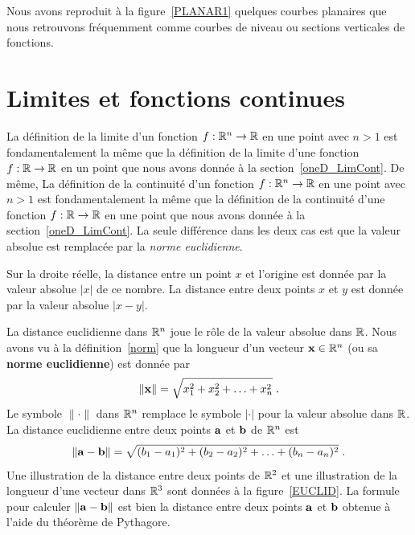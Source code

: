 {Nous avons reproduit à la figure~\ref{PLANAR1} quelques courbes
planaires que nous retrouvons fréquemment comme courbes de niveau ou
sections verticales de fonctions.



\section{Limites et fonctions continues}

La définition de la limite d'un fonction $f:\mathbb{R}^n \to \mathbb{R}$ en une
point avec $n>1$ est fondamentalement la même que la définition de la
limite d'une fonction $f:\mathbb{R} \to \mathbb{R}$ en un point que nous avons
donnée à la section~\ref{oneD_LimCont}.   De même, La définition de la
continuité d'un fonction $f:\mathbb{R}^n \to \mathbb{R}$ en une point avec $n>1$ est
fondamentalement la même que la définition de la continuité d'une
fonction $f:\mathbb{R} \to \mathbb{R}$ en une point que nous avons donnée à la
section~\ref{oneD_LimCont}.   La seule différence dans les deux cas
est que la valeur absolue est remplacée par la {\em norme euclidienne}. 

Sur la droite réelle, la distance entre un point $x$ et l'origine est
donnée par la valeur absolue $|x|$ de ce nombre.  La distance entre
deux points $x$ et $y$ est donnée par la valeur absolue $|x-y|$.

La distance euclidienne dans $\mathbb{R}^n$ joue le rôle de la valeur absolue
dans $\mathbb{R}$.  Nous avons vu à la définition~\ref{norm} que la longueur d'un
vecteur $\mathbf{x} \in \mathbb{R}^n$ (ou sa
{\bfseries norme euclidienne}) est donnée par 
\[
\| \mathbf{x} \| = \sqrt{x_1^2 + x_2^2 + \ldots + x_n^2} \; .
\]
Le symbole $\| \cdot \|$ dans $\mathbb{R}^n$ remplace le symbole $|\cdot|$
pour la valeur absolue dans $\mathbb{R}$.
La distance euclidienne entre deux points $\mathbf{a}$ et $\mathbf{b}$ de
$\mathbb{R}^n$ est
\[
\|\mathbf{a} - \mathbf{b} \| = \sqrt{(b_1-a_1)^2 + (b_2-a_2)^2 + \ldots
+ (b_n-a_n)^2} \; .
\]
Une illustration de la distance entre deux points de $\mathbb{R}^2$ et une
illustration de la longueur d'une vecteur dans $\mathbb{R}^3$ sont données à la
figure~\ref{EUCLID}.  La formule pour calculer $\| \mathbf{a} - \mathbf{b} \|$
est bien la distance entre deux points $\mathbf{a}$ et $\mathbf{b}$
obtenue à l'aide du théorème de Pythagore.

}
